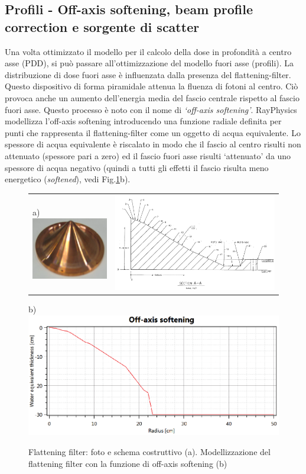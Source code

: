 \subsection{Profili - Off-axis softening, beam profile correction e sorgente di scatter}
Una volta ottimizzato il modello per il calcolo della dose in profondità a centro asse (PDD), si può passare all'ottimizzazione del modello fuori asse (profili). La distribuzione di dose fuori asse è influenzata dalla presenza del flattening-filter. Questo dispositivo di forma piramidale attenua la fluenza di fotoni al centro. Ciò provoca anche un aumento dell'energia media del fascio centrale rispetto al fascio fuori asse. Questo processo è noto con il nome di \textit{`off-axis softening'}. RayPhysics modellizza l'off-axis softening introducendo una funzione radiale definita per punti che rappresenta il flattening-filter come un oggetto di acqua equivalente. Lo spessore di acqua equivalente è riscalato in modo che il fascio al centro risulti non attenuato (spessore pari a zero) ed il fascio fuori asse risulti `attenuato' da uno spessore di acqua negativo (quindi a tutti gli effetti il fascio risulta meno energetico (\textit{softened}), vedi Fig.\ref{fig:Ray_flatt}b).
\begin{figure}[!t]
\centering
\begin{tabular}{m{}m{}}
\vspace*{-0.5cm}a)\includegraphics[width=.3\textwidth]{./cap2/Ray_flatt1.png} &
\includegraphics[width=.6\textwidth]{./cap2/Ray_flatt2.png}
\end{tabular}
b)\includegraphics[width=.9\textwidth]{./cap2/Ray_flatt3.png}
\caption{Flattening filter: foto e schema costruttivo (a). Modellizzazione del flattening filter con la funzione di off-axis softening (b)}
\label{fig:Ray_flatt}
\end{figure}

